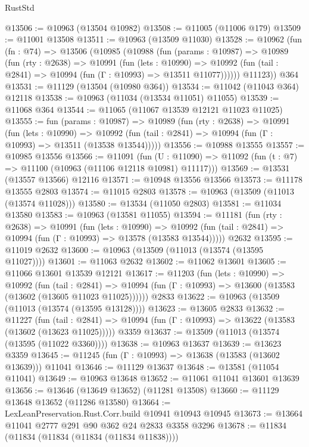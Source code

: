 \begin{lexlean}{RustStd}
\begin{coremodule}
@13506 := @10963 (@13504 @10982)
@13508 := @11005 (@11006 @179)
@13509 := @11001 @13508
@13511 := @10963 (@13509 @11030)
@13528 := @10962
    (fun (fn : @74) =>
    @13506
      (@10985
        (@10988
          (fun (params : @10987) =>
          @10989
            (fun (rty : @2638) =>
            @10991
              (fun (lets : @10990) =>
              @10992 (fun (tail : @2841) => @10994 (fun (Γ : @10993) => @13511 @11077))))))
        @11123))
    @364
@13531 := @11129 (@13504 (@10980 @364))
@13534 := @11042 (@11043 @364) @12118
@13538 := @10963 (@11034 (@13534 @11051) @11055)
@13539 := @11068 @364
@13544 := @11065 (@11067 @13539 @12121 @11023 @11025)
@13555 := fun (params : @10987) =>
  @10989
    (fun (rty : @2638) =>
    @10991
      (fun (lets : @10990) =>
      @10992 (fun (tail : @2841) => @10994 (fun (Γ : @10993) => @13511 (@13538 @13544)))))
@13556 := @10988 @13555
@13557 := @10985 @13556
@13566 := @11091
    (fun (U : @11090) => @11092 (fun (t : @7) => @11100 (@10963 (@11106 @12118 @10981) @11117)))
@13569 := @13531 (@13557 @13566) @12116
@13571 := @10948 @13556 @13566
@13573 := @11178 @13555 @2803
@13574 := @11015 @2803
@13578 := @10963 (@13509 (@11013 (@13574 @11028)))
@13580 := @13534 (@11050 @2803)
@13581 := @11034 @13580
@13583 := @10963 (@13581 @11055)
@13594 := @11181
    (fun (rty : @2638) =>
    @10991
      (fun (lets : @10990) =>
      @10992 (fun (tail : @2841) => @10994 (fun (Γ : @10993) => @13578 (@13583 @13544)))))
    @2632
@13595 := @11019 @2632
@13600 := @10963 (@13509 (@11013 (@13574 (@13595 @11027))))
@13601 := @11063 @2632
@13602 := @11062 @13601
@13605 := @11066 @13601 @13539 @12121
@13617 := @11203
    (fun (lets : @10990) =>
    @10992
      (fun (tail : @2841) =>
      @10994 (fun (Γ : @10993) => @13600 (@13583 (@13602 (@13605 @11023 @11025))))))
    @2833
@13622 := @10963 (@13509 (@11013 (@13574 (@13595 @13128))))
@13623 := @13605 @2833
@13632 := @11227
    (fun (tail : @2841) => @10994 (fun (Γ : @10993) => @13622 (@13583 (@13602 (@13623 @11025)))))
    @3359
@13637 := @13509 (@11013 (@13574 (@13595 (@11022 @3360))))
@13638 := @10963 @13637
@13639 := @13623 @3359
@13645 := @11245 (fun (Γ : @10993) => @13638 (@13583 (@13602 @13639))) @11041
@13646 := @11129 @13637
@13648 := @13581 (@11054 @11041)
@13649 := @10963 @13648
@13652 := @11061 @11041 @13601 @13639
@13656 := @13646 (@13649 @13652) (@11281 @13508)
@13660 := @11129 @13648 @13652 (@11286 @13580)
@13664 := LexLeanPreservation.Rust.Corr.build @10941 @10943 @10945
@13673 := @13664 @11041 @2777 @291 @90 @362 @24 @2833 @3358 @3296
@13678 := @11834 (@11834 (@11834 (@11834 (@11834 @11838))))

\end{coremodule}
\end{lexlean}
